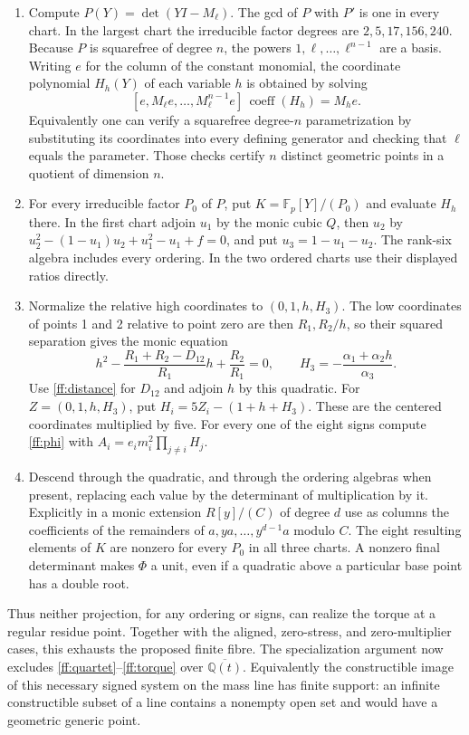 \documentclass[11pt,letterpaper]{article}
\theoremstyle{definition}
\begin{document}
\begin{enumerate}
\item Compute $P(Y)=\det(YI-M_\ell)$. The gcd of $P$ with $P'$
is one in every chart. In the largest chart the irreducible factor
degrees are $2,5,17,156,240$. Because $P$ is squarefree of degree
$n$, the powers $1,\ell,\ldots,\ell^{n-1}$ are a basis.
Writing $e$ for the column of the constant monomial, the coordinate
polynomial $H_h(Y)$ of each variable $h$ is obtained by solving
\[
 [e,M_\ell e,\ldots,M_\ell^{n-1}e]\,
     \operatorname{coeff}(H_h)=M_h e .
\]
Equivalently one can verify a squarefree degree-$n$ parametrization
by substituting its coordinates into every defining generator and
checking that $\ell$ equals the parameter. Those checks certify $n$
distinct geometric points in a quotient of dimension $n$.
\item For every irreducible factor $P_0$ of $P$, put
$K=\mathbb F_p[Y]/(P_0)$ and evaluate $H_h$ there. In the first
chart adjoin $u_1$ by the monic cubic $Q$, then $u_2$ by
$u_2^2-(1-u_1)u_2+u_1^2-u_1+f=0$, and put
$u_3=1-u_1-u_2$. The rank-six algebra includes every ordering.
In the two ordered charts use their displayed ratios directly.
\item Normalize the relative high coordinates to $(0,1,h,H_3)$.
The low coordinates of points 1 and 2 relative to point zero are
then $R_1,R_2/h$, so their squared separation gives the monic
equation
\[
 h^2-\frac{R_1+R_2-D_{12}}{R_1}h+\frac{R_2}{R_1}=0,\qquad
 H_3=-\frac{\alpha_1+\alpha_2 h}{\alpha_3}.
\]
Use \eqref{ff:distance} for $D_{12}$ and adjoin $h$ by this
quadratic. For $Z=(0,1,h,H_3)$, put $H_i=5Z_i-(1+h+H_3)$.
These are the centered coordinates multiplied by five.
For every one of the eight signs compute \eqref{ff:phi} with
$A_i=e_i m_i^2\prod_{j\ne i}H_j$.
\item Descend through the quadratic, and through the ordering
algebras when present, replacing each value by the determinant of
multiplication by it. Explicitly in a monic extension
$R[y]/(C)$ of degree $d$ use as columns the coefficients of the
remainders of $a,ya,\ldots,y^{d-1}a$ modulo $C$. The eight
resulting elements of $K$ are nonzero for every $P_0$ in all three
charts. A nonzero final determinant makes $\Phi$ a unit, even if a
quadratic above a particular base point has a double root.
\end{enumerate}
Thus neither projection, for any ordering or signs, can realize the
torque at a regular residue point. Together with the aligned,
zero-stress, and zero-multiplier cases, this exhausts the proposed
finite fibre. The specialization argument now excludes
\eqref{ff:quartet}--\eqref{ff:torque} over
$\overline{\mathbb Q(t)}$. Equivalently the constructible image
of this necessary signed system on the mass line has finite support:
an infinite constructible subset of a line contains a nonempty open
set and would have a geometric generic point.
\end{document}
